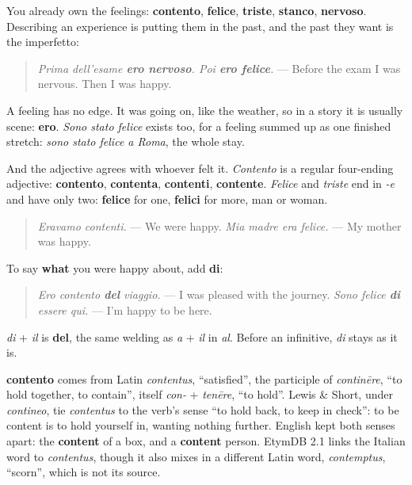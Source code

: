 \begin{grammarlens}[title={Grammar Lens: a feeling is scene}]
You already own the feelings: \textbf{contento}, \textbf{felice}, \textbf{triste}, \textbf{stanco}, \textbf{nervoso}. Describing an experience is putting them in the past, and the past they want is the imperfetto:

\begin{quote}
\emph{Prima dell'esame \textbf{ero nervoso}. Poi \textbf{ero felice}.} — Before the exam I was nervous. Then I was happy.
\end{quote}

A feeling has no edge. It was going on, like the weather, so in a story it is usually scene: \textbf{ero}. \emph{Sono stato felice} exists too, for a feeling summed up as one finished stretch: \emph{sono stato felice a Roma}, the whole stay.

And the adjective agrees with whoever felt it. \emph{Contento} is a regular four-ending adjective: \textbf{contento}, \textbf{contenta}, \textbf{contenti}, \textbf{contente}. \emph{Felice} and \emph{triste} end in \emph{-e} and have only two: \textbf{felice} for one, \textbf{felici} for more, man or woman.

\begin{quote}
\emph{Eravamo contenti.} — We were happy. \emph{Mia madre era felice.} — My mother was happy.
\end{quote}
\end{grammarlens}

\begin{grammarlens}[title={Grammar Lens: contento di}]
To say \textbf{what} you were happy about, add \textbf{di}:

\begin{quote}
\emph{Ero contento \textbf{del} viaggio.} — I was pleased with the journey. \emph{Sono felice \textbf{di} essere qui.} — I'm happy to be here.
\end{quote}

\emph{di} + \emph{il} is \textbf{del}, the same welding as \emph{a} + \emph{il} in \emph{al}. Before an infinitive, \emph{di} stays as it is.
\end{grammarlens}

\begin{cousinweb}
\textbf{contento} comes from Latin \emph{contentus}, \textquotedblleft{}satisfied\textquotedblright{}, the participle of \emph{continēre}, \textquotedblleft{}to hold together, to contain\textquotedblright{}, itself \emph{con-} + \emph{tenēre}, \textquotedblleft{}to hold\textquotedblright{}. Lewis \& Short, under \emph{contineo}, tie \emph{contentus} to the verb's sense \textquotedblleft{}to hold back, to keep in check\textquotedblright{}: to be content is to hold yourself in, wanting nothing further. English kept both senses apart: the \textbf{content} of a box, and a \textbf{content} person. EtymDB 2.1 links the Italian word to \emph{contentus}, though it also mixes in a different Latin word, \emph{contemptus}, \textquotedblleft{}scorn\textquotedblright{}, which is not its source.
\end{cousinweb}

